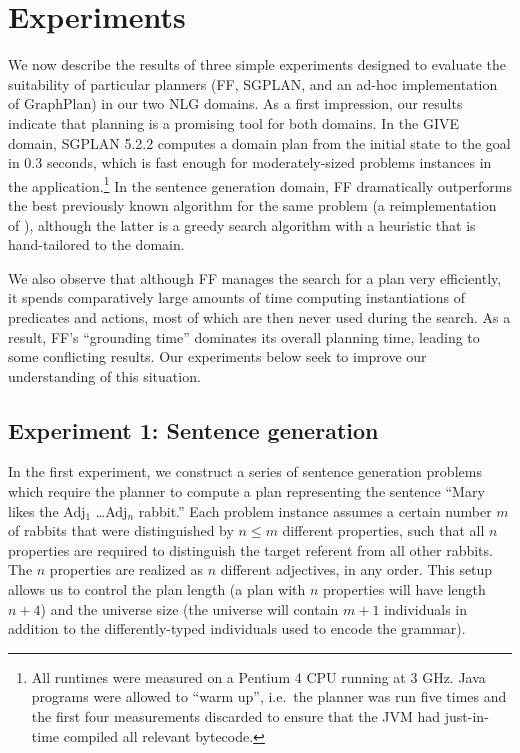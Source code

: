 \section{Experiments} \label{sec:experiments}

We now describe the results of three simple experiments designed to
evaluate the suitability of particular planners (FF, SGPLAN, and an ad-hoc
implementation of GraphPlan) in our two NLG domains. As a first impression,
our results indicate that planning is a promising tool for both domains. In
the GIVE domain, SGPLAN 5.2.2 computes a domain plan from the initial state
to the goal in 0.3 seconds, which is fast enough for moderately-sized
problems instances in the application.\footnote{All runtimes were
  measured on a Pentium 4 CPU running at 3 GHz. Java programs were allowed
  to ``warm up'', i.e.\ the planner was run five times and the first four
  measurements discarded to ensure that the JVM had just-in-time compiled
  all relevant bytecode.}
In the sentence generation domain, FF dramatically outperforms the best
previously known algorithm for the same problem (a reimplementation of
\cite{Stone2003a}), although the latter is a greedy search algorithm with a
heuristic that is hand-tailored to the domain.

We also observe that although FF manages the search for a plan very
efficiently, it spends comparatively large amounts of time computing
instantiations of predicates and actions, most of which are then never used
during the search. As a result, FF's ``grounding time'' dominates its
overall planning time, leading to some conflicting results. Our experiments
below seek to improve our understanding of this situation.


\subsection{Experiment 1: Sentence generation}
\label{sec:exper-1:-sent}

In the first experiment, we construct a series of sentence generation
problems which require the planner to compute a plan representing the
sentence ``Mary likes the Adj$_1$ \ldots Adj$_n$ rabbit.''  Each problem
instance assumes a certain number $m$ of rabbits that were distinguished by
$n \leq m$ different properties, such that all $n$ properties are required
to distinguish the target referent from all other rabbits.  The $n$
properties are realized as $n$ different adjectives, in any order.  This
setup allows us to control the plan length (a plan with $n$ properties will
have length $n+4$) and the universe size (the universe will contain $m+1$
individuals in addition to the differently-typed individuals used to encode
the grammar).

